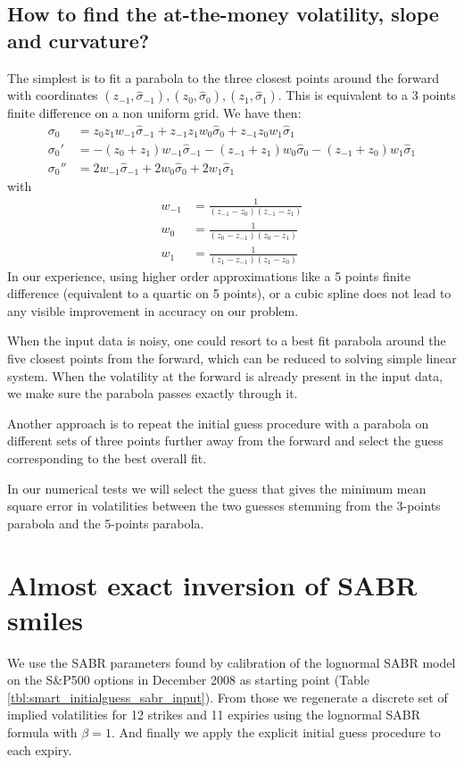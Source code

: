\documentclass[]{rAMF2e}
\begin{document}
\subsection{How to find the at-the-money volatility, slope and curvature?}
The simplest is to fit a parabola to the three closest points around the forward with coordinates $(z_{-1}, \hat{\sigma}_{-1}), (z_0,\hat{\sigma}_0), (z_{1},\hat{\sigma}_1)$. This is equivalent to a 3 points finite difference on a non uniform grid. We have then:
\begin{align}
\sigma_0 &= z_0 z_1 w_{-1} \hat{\sigma}_{-1} + z_{-1} z_1 w_{0} \hat{\sigma}_{0} +  z_{-1} z_0w_{1} \hat{\sigma}_{1}\\
\sigma_0' &= -(z_0 + z_1) w_{-1} \hat{\sigma}_{-1} - (z_{-1}+ z_1) w_{0} \hat{\sigma}_{0} -  (z_{-1}+ z_0)w_{1} \hat{\sigma}_{1}\\
\sigma_0'' &= 2 w_{-1} \hat{\sigma}_{-1} +2 w_{0} \hat{\sigma}_{0} + 2w_{1} \hat{\sigma}_{1}
\end{align}
with 
\begin{align}
w_{-1} &= \frac{1}{(z_{-1}-z_{0})(z_{-1}-z_{1})}\\
w_{0} &= \frac{1}{(z_{0}-z_{-1})(z_{0}-z_{1})}\\
w_{1} &= \frac{1}{(z_{1}-z_{-1})(z_{1}-z_{0})}
\end{align}
In our experience, using higher order approximations like a 5 points finite difference (equivalent to a quartic on 5 points), or a cubic spline does not lead to any visible improvement in accuracy on our problem.
 
When the input data is noisy, one could resort to a best fit parabola around the five closest points from the forward, which can be reduced to solving simple linear system. When the volatility at the forward is already present in the input data, we make sure the parabola passes exactly through it.

Another approach is to repeat the initial guess procedure with a parabola on different sets of three points further away from the forward and select the guess corresponding to the best overall fit.

In our numerical tests we will select the guess that gives the minimum mean square error in volatilities between the two guesses stemming from the 3-points parabola and the 5-points parabola.
\section{Almost exact inversion of SABR smiles}
We use the SABR parameters found by calibration of the lognormal SABR model on the S\&P500 options in December 2008 as starting point (Table \ref{tbl:smart_initialguess_sabr_input}). From those we regenerate a discrete set of implied volatilities for 12 strikes and 11 expiries using the lognormal SABR formula with $\beta = 1$. And finally we apply the explicit initial guess procedure to each expiry.
\end{document}
